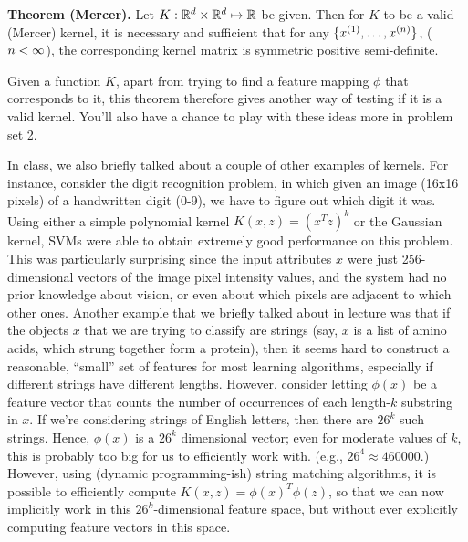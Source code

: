 \documentclass{article}
\begin{document}
\bigskip
\noindent
{\bf Theorem (Mercer).} Let $K : {\mathbb R}^{d} \times {\mathbb R}^{d} \mapsto {\mathbb R}$ be given.  Then for $K$ to
be a valid (Mercer) kernel, it is necessary and sufficient that for any $\{x^{(1)}, \ldots, x^{({n})}\}$,
(${n} < \infty$), the corresponding kernel matrix is symmetric positive semi-definite.
\bigskip

Given a function $K$, apart from trying to find a feature mapping $\phi$ that corresponds
to it, this theorem therefore gives another way of testing if it is a valid kernel.
You'll also have a chance to play with these ideas more in problem set 2.

In class, we also briefly talked about a couple of other examples of kernels.  For instance,
consider the digit recognition problem, in which given an image (16x16 pixels) of a handwritten
digit (0-9), we have to figure out which digit it was.  Using either a simple polynomial
kernel $K(x,z) = (x^Tz)^{k}$ or the Gaussian
kernel, SVMs were able to obtain extremely good performance on this problem.
This was particularly surprising since the input attributes $x$ were just 256-dimensional
vectors of the image pixel intensity values, and the system had no prior knowledge about vision,
or even about which pixels are adjacent to which other ones.  Another example that we briefly
talked about in lecture was that if the objects $x$ that we are trying to classify are strings (say, $x$ is a list of amino
acids, which strung together form a protein), then it seems hard to construct a reasonable, ``small''
set of features for most learning algorithms, especially if different strings have different lengths.
However, consider letting $\phi(x)$ be a feature vector that counts the
number of occurrences of each length-$k$ substring in $x$.  If we're considering strings of English
letters, then there are $26^k$ such strings.  Hence, $\phi(x)$ is a $26^k$ dimensional vector;
even for moderate values of $k$, this is probably too big for us to efficiently work with.
(e.g., $26^4 \approx 460000$.)  However, using
(dynamic programming-ish) string matching algorithms, it is possible to efficiently
compute $K(x,z) = \phi(x)^T\phi(z)$, so that we can now implicitly work in this $26^k$-dimensional
feature space, but without ever explicitly computing feature vectors in this space.
\end{document}
